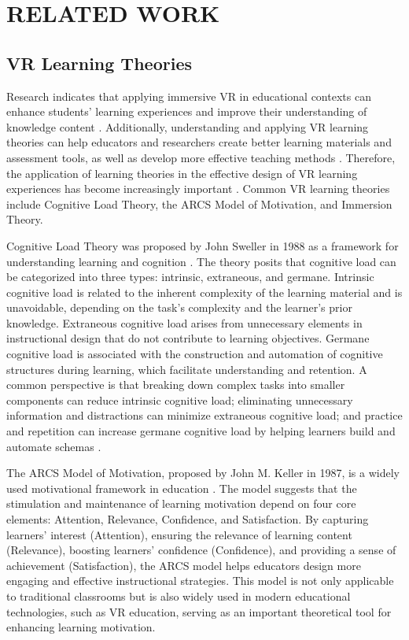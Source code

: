 \documentclass[runningheads]{llncs}
\begin{document}
\section{RELATED WORK}
\subsection{VR Learning Theories}
Research indicates that applying immersive VR in educational contexts can enhance students' learning experiences and improve their understanding of knowledge content \cite{freina2015literature}. Additionally, understanding and applying VR learning theories can help educators and researchers create better learning materials and assessment tools, as well as develop more effective teaching methods \cite{matovu2023immersive}. Therefore, the application of learning theories in the effective design of VR learning experiences has become increasingly important \cite{marougkas2023virtual}. Common VR learning theories include Cognitive Load Theory, the ARCS Model of Motivation, and Immersion Theory.

Cognitive Load Theory was proposed by John Sweller in 1988 as a framework for understanding learning and cognition \cite{sweller1988cognitive}. The theory posits that cognitive load can be categorized into three types: intrinsic, extraneous, and germane. Intrinsic cognitive load is related to the inherent complexity of the learning material and is unavoidable, depending on the task's complexity and the learner's prior knowledge. Extraneous cognitive load arises from unnecessary elements in instructional design that do not contribute to learning objectives. Germane cognitive load is associated with the construction and automation of cognitive structures during learning, which facilitate understanding and retention. A common perspective is that breaking down complex tasks into smaller components can reduce intrinsic cognitive load; eliminating unnecessary information and distractions can minimize extraneous cognitive load; and practice and repetition can increase germane cognitive load by helping learners build and automate schemas \cite{baceviciute2022investigating}.

The ARCS Model of Motivation, proposed by John M. Keller in 1987, is a widely used motivational framework in education \cite{keller1987development}. The model suggests that the stimulation and maintenance of learning motivation depend on four core elements: Attention, Relevance, Confidence, and Satisfaction. By capturing learners' interest (Attention), ensuring the relevance of learning content (Relevance), boosting learners' confidence (Confidence), and providing a sense of achievement (Satisfaction), the ARCS model helps educators design more engaging and effective instructional strategies. This model is not only applicable to traditional classrooms but is also widely used in modern educational technologies, such as VR education, serving as an important theoretical tool for enhancing learning motivation.
\end{document}
